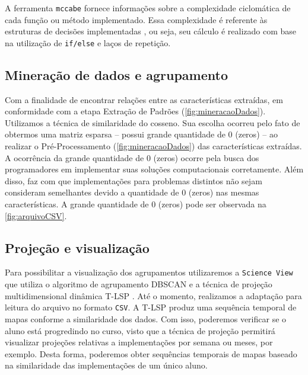 %	
	
			A ferramenta \texttt{mccabe} \cite{mccabe2013} fornece informações sobre a
			complexidade ciclomática \cite{mccabe} de cada função ou método implementado.
			Essa complexidade é referente às estruturas de decisões implementadas \cite{mccabe},
			ou seja, seu cálculo é realizado com base na utilização de \texttt{if/else} e laços
			de repetição.
			
		
		\subsection{Mineração de dados e agrupamento}
			Com a finalidade de encontrar relações entre as características extraídas, em
			conformidade com a etapa Extração de Padrões (\cref{fig:mineracaoDados}).
			Utilizamos a técnica de similaridade do cosseno. Sua escolha ocorreu pelo fato de obtermos
			uma matriz esparsa -- possui grande quantidade de 0 (zeros) -- ao realizar o
			Pré-Processamento (\cref{fig:mineracaoDados}) das características extraídas. A
			ocorrência da grande quantidade de 0 (zeros) ocorre pela busca dos programadores
			em implementar suas soluções computacionais corretamente. Além disso, faz com que
			implementações para problemas distintos não sejam consideram semelhantes devido a
			quantidade de 0 (zeros) nas mesmas características. A grande quantidade de 0 (zeros)
			pode ser observada na \cref{fig:arquivoCSV}.
		
		\subsection{Projeção e visualização}
			Para possibilitar a visualização dos agrupamentos utilizaremos a \texttt{Science View}
			\cite{Alencar-etal:2012} que utiliza o algoritmo de agrupamento \acs{DBSCAN} \cite{Ester1996}
			e a técnica de projeção multidimensional dinâmica \ac{T-LSP} \cite{Alencar}. Até o momento,
			realizamos a adaptação para leitura do arquivo no formato \texttt{CSV}. A \acs{T-LSP} \cite{Alencar}
			produz uma sequência temporal de mapas conforme a similaridade dos dados. Com isso, poderemos
			verificar se o aluno está progredindo no curso, visto que a técnica de projeção permitirá
			visualizar projeções relativas a implementações por semana ou meses, por exemplo. Desta
			forma, poderemos obter sequências temporais de mapas baseado na similaridade das
			implementações de um único aluno.
			

